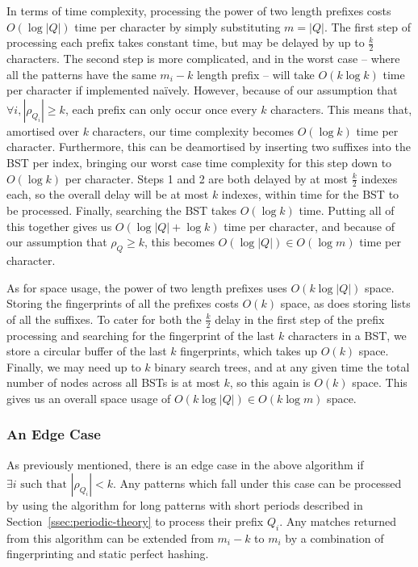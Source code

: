 \documentclass[ %
                    author={Dominic Joseph Moylett},
                    degree={MEng},
                     title={Dictionary Matching with Fingerprints},
                  subtitle={An Empirical Analysis},
                      type={research},
                      year={2015} ]{dissertation}
\begin{document}
In terms of time complexity, processing the power of two length prefixes costs $O(\log|Q|)$ time per character by simply substituting $m = |Q|$. The first step of processing each prefix takes constant time, but may be delayed by up to $\frac{k}{2}$ characters. The second step is more complicated, and in the worst case  --  where all the patterns have the same $m_i - k$ length prefix  --  will take $O(k\log k)$ time per character if implemented na\"{i}vely. However, because of our assumption that $\forall i, |\rho_{Q_i}| \geq k$, each prefix can only occur once every $k$ characters. This means that, amortised over $k$ characters, our time complexity becomes $O(\log k)$ time per character. Furthermore, this can be deamortised by inserting two suffixes into the BST per index, bringing our worst case time complexity for this step down to $O(\log k)$ per character. Steps 1 and 2 are both delayed by at most $\frac{k}{2}$ indexes each, so the overall delay will be at most $k$ indexes, within time for the BST to be processed. Finally, searching the BST takes $O(\log k)$ time. Putting all of this together gives us $O(\log|Q| + \log k)$ time per character, and because of our assumption that $\rho_Q \geq k$, this becomes $O(\log|Q|) \in O(\log m)$ time per character.

As for space usage, the power of two length prefixes uses $O(k\log|Q|)$ space. Storing the fingerprints of all the prefixes costs $O(k)$ space, as does storing lists of all the suffixes. To cater for both the $\frac{k}{2}$ delay in the first step of the prefix processing and searching for the fingerprint of the last $k$ characters in a BST, we store a circular buffer of the last $k$ fingerprints, which takes up $O(k)$ space. Finally, we may need up to $k$ binary search trees, and at any given time the total number of nodes across all BSTs is at most $k$, so this again is $O(k)$ space. This gives us an overall space usage of $O(k\log|Q|) \in O(k\log m)$ space.

\subsubsection{An Edge Case}
\label{sssec:edge-case-theory}

As previously mentioned, there is an edge case in the above algorithm if $\exists i \text{ such that } |\rho_{Q_i}| < k$. Any patterns which fall under this case can be processed by using the algorithm for long patterns with short periods described in Section~\ref{ssec:periodic-theory} to process their prefix $Q_i$. Any matches returned from this algorithm can be extended from $m_i - k$ to $m_i$ by a combination of fingerprinting and static perfect hashing.
\end{document}
